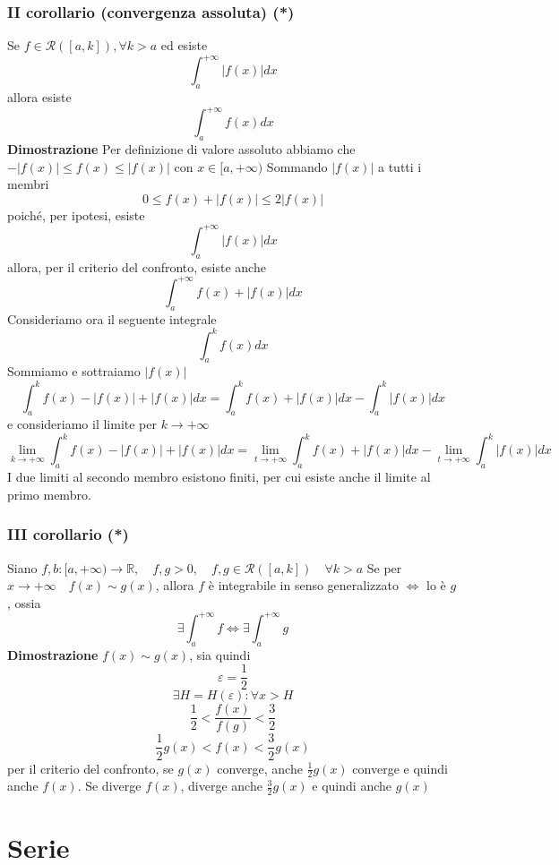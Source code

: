 \documentclass[12pt]{article}
\begin{document}
\subsubsection{II corollario (convergenza assoluta) (*)}
Se $f \in \mathscr{R}([a,k]), \forall k > a$ ed esiste
\[ \int_a^{+\infty}|f(x)|dx \]
allora esiste
\[ \int_a^{+\infty}f(x)dx \]
\textbf{Dimostrazione}\newline
Per definizione di valore assoluto abbiamo che $-|f(x)|\leq f(x) \leq |f(x)|$ con $x\in [a, +\infty)$\newline
Sommando $|f(x)|$ a tutti i membri
\[ 0\leq f(x) + |f(x)| \leq 2|f(x)| \]
poiché, per ipotesi, esiste
\[ \int_{a}^{+\infty} |f(x)| dx\]
 allora, per il criterio del confronto, esiste anche 
\[ \int_{a}^{+\infty} f(x) + |f(x)| dx \]
Consideriamo ora il seguente integrale
\[ \int_{a}^{k} f(x) dx \]
Sommiamo e sottraiamo $|f(x)|$
\[ \int_{a}^{k} f(x) - |f(x)| + |f(x)| dx = \int_{a}^{k} f(x) + |f(x)| dx - \int_{a}^{k} |f(x)| dx\]
e consideriamo il limite per $k \to +\infty$
\[ \lim_{k \to +\infty} \int_{a}^{k} f(x) - |f(x)| + |f(x)| dx = \lim_{t \to +\infty} \int_{a}^{k} f(x) + |f(x)| dx - \lim_{t \to +\infty} \int_{a}^{k} |f(x)| dx\]
I due limiti al secondo membro esistono finiti, per cui esiste anche il limite al primo membro.

\subsubsection{III corollario (*)}
Siano  $f,b : [a, +\infty) \to \mathbb{R}, \quad f,g>0, \quad f,g \in \mathscr{R}([a,k]) \quad \forall k>a$\newline
Se per $x \to +\infty \quad f(x) \sim g(x)$, allora\newline
$f$ è integrabile in senso generalizzato $\Leftrightarrow$ lo è $g$, ossia
\[ \exists \int_a^{+\infty} f \Leftrightarrow \exists \int_a^{+\infty} g\]
\textbf{Dimostrazione}\newline
$f(x)\sim g(x)$, sia quindi
\[ \varepsilon = \frac{1}{2}\]
\[ \exists H = H(\varepsilon) : \forall x > H \]
\[ \frac{1}{2} < \frac{f(x)}{f(g)} < \frac{3}{2} \]
\[ \frac{1}{2} g(x) < f(x) < \frac{3}{2} g(x)\]
per il criterio del confronto, se $g(x)$ converge, anche $\frac{1}{2} g(x)$ converge e quindi anche $f(x)$. Se diverge $f(x)$, diverge anche $\frac{3}{2}g(x)$ e quindi anche $g(x)$

\section{Serie}
\end{document}
